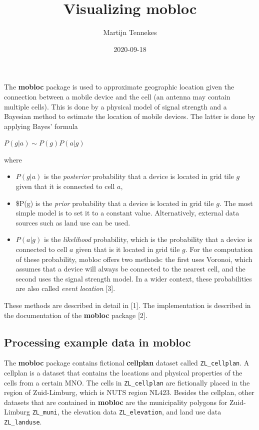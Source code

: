 \documentclass[
]{article}
\title{Visualizing mobloc}
\author{Martijn Tennekes}
\date{2020-09-18}
\providecommand{\tightlist}{%
  \setlength{\itemsep}{0pt}\setlength{\parskip}{0pt}}
\begin{document}
\maketitle

The \textbf{mobloc} package is used to approximate geographic location
given the connection between a mobile device and the cell (an antenna
may contain multiple cells). This is done by a physical model of signal
strength and a Bayesian method to estimate the location of mobile
devices. The latter is done by applying Bayes' formula

\(P(g|a) \sim P(g)P(a|g)\)

where

\begin{itemize}
\tightlist
\item
  \(P(g|a)\) is the \emph{posterior} probability that a device is
  located in grid tile \(g\) given that it is connected to cell \(a\),
\item
  \$P(g) is the \emph{prior} probability that a device is located in
  grid tile \(g\). The most simple model is to set it to a constant
  value. Alternatively, external data sources such as land use can be
  used.
\item
  \(P(a|g)\) is the \emph{likelihood} probability, which is the
  probability that a device is connected to cell \(a\) given that is it
  located in grid tile \(g\). For the computation of these probability,
  mobloc offers two methods: the first uses Voronoi, which assumes that
  a device will always be connected to the nearest cell, and the second
  uses the signal strength model. In a wider context, these
  probabilities are also called \emph{event location} {[}3{]}.
\end{itemize}

These methods are described in detail in {[}1{]}. The implementation is
described in the documentation of the \textbf{mobloc} package {[}2{]}.

\hypertarget{processing-example-data-in-mobloc}{%
\subsection{Processing example data in
mobloc}\label{processing-example-data-in-mobloc}}

The \textbf{mobloc} package contains fictional \textbf{cellplan} dataset
called \texttt{ZL\_cellplan}. A cellplan is a dataset that contains the
locations and physical properties of the cells from a certain MNO. The
cells in \texttt{ZL\_cellplan} are fictionally placed in the region of
Zuid-Limburg, which is NUTS region NL423. Besides the cellplan, other
datasets that are contained in \textbf{mobloc} are the municipality
polygons for Zuid-Limburg \texttt{ZL\_muni}, the elevation data
\texttt{ZL\_elevation}, and land use data \texttt{ZL\_landuse}.
\end{document}

